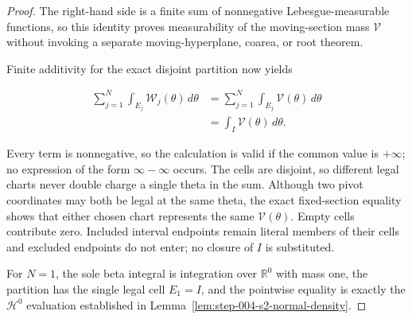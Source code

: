 \begin{proof}
The right-hand side is a finite sum of nonnegative Lebesgue-measurable functions, so this identity proves
measurability of the moving-section mass \(\mathcal V\) without invoking a separate moving-hyperplane,
coarea, or root theorem.

Finite additivity for the exact disjoint partition now yields

\begin{equation}
\label{eq:appendix-display-140}
\begin{aligned}
\sum_{j=1}^N\int_{E_j}\mathcal W_j(\theta)\,d\theta
&=\sum_{j=1}^N\int_{E_j}\mathcal V(\theta)\,d\theta\\
&=\int_I\mathcal V(\theta)\,d\theta.
\end{aligned}
\end{equation}

Every term is nonnegative, so the calculation is valid if the common value is \(+\infty\); no expression of
the form \(\infty-\infty\) occurs. The cells are disjoint, so different legal charts never double charge a
single theta in the sum. Although two pivot coordinates may both be legal at the same theta, the exact
fixed-section equality shows that either chosen chart represents the same \(\mathcal V(\theta)\). Empty cells
contribute zero. Included interval endpoints remain literal members of their cells and excluded endpoints do
not enter; no closure of \(I\) is substituted.

For \(N=1\), the sole beta integral is integration over \(\mathbb R^0\) with mass one, the partition has the
single legal cell \(E_1=I\), and the pointwise equality is exactly the \(\mathcal H^0\) evaluation established
in Lemma~\ref{lem:step-004-s2-normal-density}. 
\end{proof}

